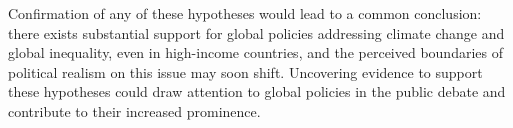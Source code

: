 

Confirmation of any of these hypotheses would lead to a common conclusion: there exists substantial support for global policies addressing climate change and global inequality, even in high-income countries, and the perceived boundaries of political realism on this issue may soon shift. Uncovering evidence to support these hypotheses could %
draw attention to global policies in the public debate and contribute to their increased prominence. %




